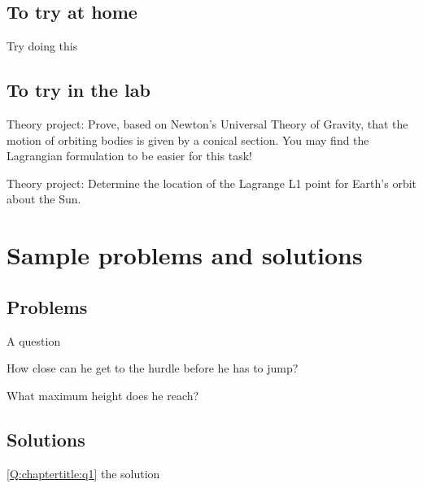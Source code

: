 \subsection{To try at home}

\begin{tQuestion}Try doing this \end{tQuestion}

\subsection{To try in the lab}
Theory project: Prove, based on Newton's Universal Theory of Gravity, that the motion of orbiting bodies is given by a conical section. You may find the Lagrangian formulation to be easier for this task!

Theory project: Determine the location of the Lagrange L1 point for Earth's orbit about the Sun.

\newpage
\section{Sample problems and solutions}
\subsection{Problems}
\begin{problemParts}{A question\label{Q:chaptertitle:q1}}
\item How close can he get to the hurdle before he has to jump?
\item What maximum height does he reach?
\end{problemParts}

\newpage
\subsection{Solutions}
\begin{solution}{\ref{Q:chaptertitle:q1}}
{
the solution
}
\end{solution}

